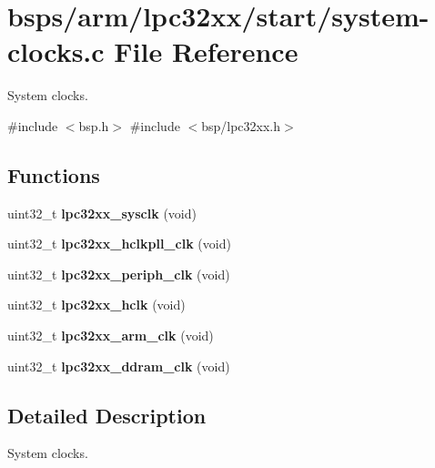 \hypertarget{lpc32xx_2start_2system-clocks_8c}{}\section{bsps/arm/lpc32xx/start/system-\/clocks.c File Reference}
\label{lpc32xx_2start_2system-clocks_8c}


System clocks.  


{\ttfamily \#include $<$bsp.\+h$>$}\newline
{\ttfamily \#include $<$bsp/lpc32xx.\+h$>$}\newline
\subsection*{Functions}
\begin{DoxyCompactItemize}
\item 
uint32\+\_\+t {\bfseries lpc32xx\+\_\+sysclk} (void)
\item 
uint32\+\_\+t {\bfseries lpc32xx\+\_\+hclkpll\+\_\+clk} (void)
\item 
uint32\+\_\+t {\bfseries lpc32xx\+\_\+periph\+\_\+clk} (void)
\item 
uint32\+\_\+t {\bfseries lpc32xx\+\_\+hclk} (void)
\item 
uint32\+\_\+t {\bfseries lpc32xx\+\_\+arm\+\_\+clk} (void)
\item 
uint32\+\_\+t {\bfseries lpc32xx\+\_\+ddram\+\_\+clk} (void)
\end{DoxyCompactItemize}


\subsection{Detailed Description}
System clocks. 

